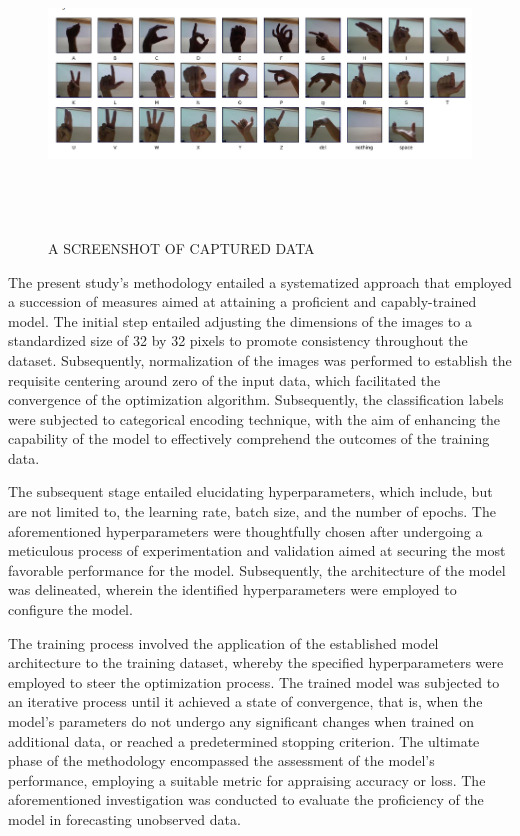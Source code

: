 \documentclass[conference]{IEEEtran}
\begin{document}
\begin{figure}[t!]
\centering
 \includegraphics[width=\textwidth,height=8cm]{Images/Data.png}
\caption{A SCREENSHOT OF CAPTURED DATA}
\label{Fig:Figure1}
\end{figure}

The present study's methodology entailed a systematized approach that employed a succession of measures aimed at attaining a proficient and capably-trained model. The initial step entailed adjusting the dimensions of the images to a standardized size of 32 by 32 pixels to promote consistency throughout the dataset. Subsequently, normalization of the images was performed to establish the requisite centering around zero of the input data, which facilitated the convergence of the optimization algorithm. Subsequently, the classification labels were subjected to categorical encoding technique, with the aim of enhancing the capability of the model to effectively comprehend the outcomes of the training data.

The subsequent stage entailed elucidating hyperparameters, which include, but are not limited to, the learning rate, batch size, and the number of epochs. The aforementioned hyperparameters were thoughtfully chosen after undergoing a meticulous process of experimentation and validation aimed at securing the most favorable performance for the model. Subsequently, the architecture of the model was delineated, wherein the identified hyperparameters were employed to configure the model.

The training process involved the application of the established model architecture to the training dataset, whereby the specified hyperparameters were employed to steer the optimization process. The trained model was subjected to an iterative process until it achieved a state of convergence, that is, when the model's parameters do not undergo any significant changes when trained on additional data, or reached a predetermined stopping criterion.
The ultimate phase of the methodology encompassed the assessment of the model's performance, employing a suitable metric for appraising accuracy or loss. The aforementioned investigation was conducted to evaluate the proficiency of the model in forecasting unobserved data. 
\end{document}

